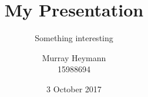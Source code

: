 \documentclass{beamer}
\title{My Presentation}
\subtitle{Something interesting}
\author{Murray Heymann\\15988694}
\institute{University of Stellenbosch}
\date{3 October 2017}
\begin{document}
\begin{frame}
	\titlepage
\end{frame}
\end{document}
